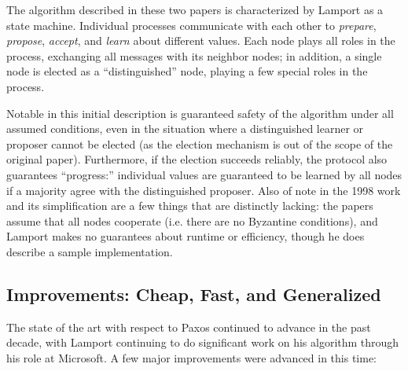 \documentclass{article}
\begin{document}
The algorithm described in these two papers is characterized by Lamport as a state machine. Individual processes communicate with each other to \textit{prepare}, \textit{propose}, \textit{accept}, and \textit{learn} about different values. Each node plays all roles in the process, exchanging all messages with its neighbor nodes; in addition, a single node is elected as a ``distinguished'' node, playing a few special roles in the process.


Notable in this initial description is guaranteed safety of the algorithm under all assumed conditions, even in the situation where a distinguished learner or proposer cannot be elected (as the election mechanism is out of the scope of the original paper). Furthermore, if the election succeeds reliably, the protocol also guarantees ``progress:'' individual values are guaranteed to be learned by all nodes if a majority agree with the distinguished proposer. Also of note in the 1998 work and its simplification are a few things that are distinctly lacking: the papers assume that all nodes cooperate (i.e. there are no Byzantine conditions), and Lamport makes no guarantees about runtime or efficiency, though he does describe a sample implementation.

\subsection{Improvements: Cheap, Fast, and Generalized}

The state of the art with respect to Paxos continued to advance in the past decade, with Lamport continuing to do significant work on his algorithm through his role at Microsoft. A few major improvements were advanced in this time:
\end{document}
